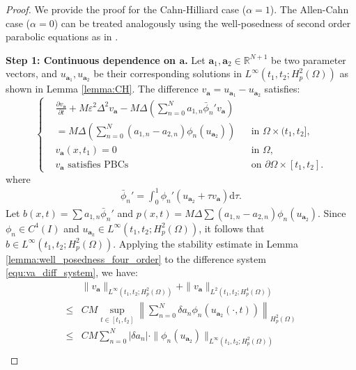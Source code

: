 \documentclass[11pt,reqno]{amsart}
\begin{document}
\begin{proof}
	We provide the proof for the Cahn-Hilliard case ($\alpha=1$). The Allen-Cahn case ($\alpha=0$) can be treated analogously using the well-posedness of second order parabolic equations as in \cite{evans2022partial}.
	
	\textbf{Step 1: Continuous dependence on $\mathbf{a}$.} Let $\mathbf{a}_1, \mathbf{a}_2 \in \mathbb{R}^{N+1}$ be two parameter vectors, and $u_{\mathbf{a}_1}, u_{\mathbf{a}_2}$ be their corresponding solutions in $L^\infty(t_1, t_2; H_p^2(\Omega))$ as shown in Lemma \ref{lemma:CH}. The difference $v_{\mathbf{a}} = u_{\mathbf{a}_1} - u_{\mathbf{a}_2}$ satisfies:
	\begin{equation}
		\label{equ:va_diff_system}
		\left\{
		\begin{aligned}
			&\frac{\partial v_{\mathbf{a}}}{\partial t} + M\varepsilon^2\Delta^2 v_{\mathbf{a}} - M \Delta \left( \sum_{n=0}^{N} a_{1,n} \bar{\phi}_n' v_{\mathbf{a}} \right) \\ &= M \Delta \left( \sum_{n=0}^{N} (a_{1,n} - a_{2,n}) \phi_n(u_{\mathbf{a}_2}) \right) && \text{in } \Omega \times (t_1, t_2], \\
			&v_{\mathbf{a}}(x, t_1) = 0 && \text{in } \Omega,\\
				& v_{\mathbf{a}} \text{ satisfies PBCs} && \text{on } \partial\Omega\times[t_1,t_2].
		\end{aligned}
		\right.
	\end{equation}
	where 
	\begin{align*}
		\bar{\phi}_n' = \int_{0}^{1} \phi_n'(u_{\mathbf{a}_2} + \tau v_{\mathbf{a}}) \mathrm{d}\tau.
	\end{align*} 
	Let $b(x,t) = \sum a_{1,n} \bar{\phi}_n'$ and $p(x,t) = M \Delta \sum (a_{1,n}-a_{2,n}) \phi_n(u_{\mathbf{a}_2})$. Since $\phi_n \in C^4(I)$ and $u_{\mathbf{a}_k} \in L^\infty(t_1, t_2; H_p^2(\Omega))$, it follows that $b \in L^{\infty}(t_1, t_2; H_p^2(\Omega))$. Applying the stability estimate in Lemma \ref{lemma:well_posedness_four_order} to the difference system \eqref{equ:va_diff_system}, we have:
	\begin{align*}
			&\|v_{\mathbf{a}}\|_{L^{\infty}(t_1, t_2; H_p^2(\Omega))} + \|v_{\mathbf{a}}\|_{L^2(t_1,t_2; H^4_p(\Omega))} \\
			\leq & C M \sup_{t \in [t_1, t_2]} \left\| \sum_{n=0}^{N} \delta a_n \phi_n(u_{\mathbf{a}_2}(\cdot, t)) \right\|_{H_p^2(\Omega)} \\
			\leq & C M \sum_{n=0}^{N} |\delta a_n| \cdot \|\phi_n(u_{\mathbf{a}_2})\|_{L^{\infty}(t_1, t_2; H_p^2(\Omega))} \\

\end{align*}
\end{proof}
\end{document}
